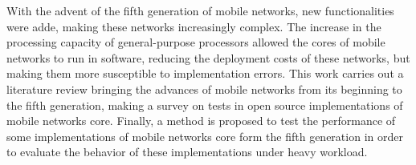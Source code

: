 With the advent of the fifth generation of mobile networks, new functionalities were adde, making these networks increasingly complex.
The increase in the processing capacity of general-purpose processors allowed the cores of mobile networks to run in software, reducing the deployment costs of these networks, but making them more susceptible to implementation errors.
This work carries out a literature review bringing the advances of mobile networks from its beginning to the fifth generation, making a survey on tests in open source implementations of mobile networks core.
Finally, a method is proposed to test the performance of some implementations of mobile networks core form the fifth generation in order to evaluate the behavior of these implementations under heavy workload.